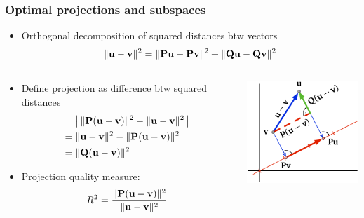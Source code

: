\documentclass[t]{beamer} %
\begin{document}
\begin{frame}
  \frametitle{Optimal projections and subspaces}

  \begin{itemize}
  \item Orthogonal decomposition of squared distances btw vectors
    \[
      \norm{\vu - \vv}^2 = \norm{\mathbf{P} \vu - \mathbf{P} \vv}^2 + \norm{\mathbf{Q} \vu - \mathbf{Q} \vv}^2
    \]
  \end{itemize}

  \begin{columns}[c]
    \begin{column}{60mm}
      \begin{itemize}
      \item<2-> Define projection  as difference btw squared distances
        \begin{align*}
          & \bigabs{\,\norm{\mathbf{P}(\vu - \vv)}^2 - \norm{\vu - \vv}^2\,} \\
          =\;& \norm{\vu - \vv}^2 - \norm{\mathbf{P}(\vu - \vv)}^2 \\
          =\;& \norm{\mathbf{Q}(\vu - \vv)}^2
        \end{align*}
      \item<3-> Projection quality measure:
        \[
          R^2 = \frac{\norm{\mathbf{P}(\vu - \vv)}^2}{\norm{\vu - \vv}^2}
        \]
      \end{itemize}
    \end{column}
    \begin{column}{40mm}
      \hspace*{-5mm}%
      \includegraphics[width=45mm]{img/7_projection_loss}      
    \end{column}
  \end{columns}
\end{frame}


\end{document}
